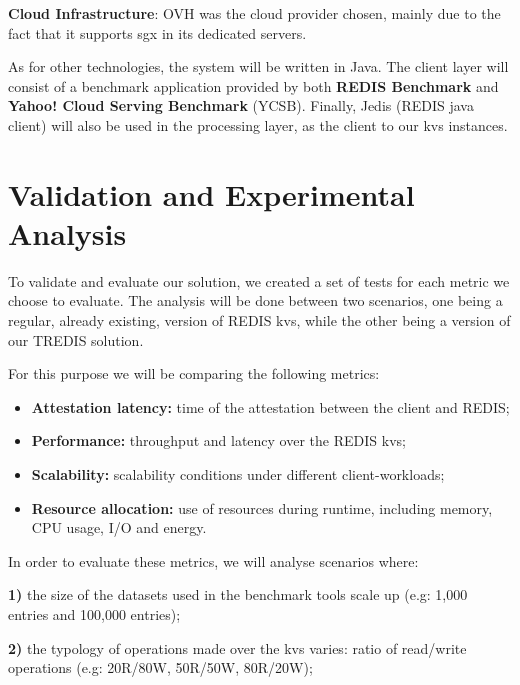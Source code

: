 \textbf{Cloud Infrastructure}: OVH \cite{ovhCloud} was the cloud provider chosen, mainly due to the fact that it supports \gls{sgx} in its dedicated servers.

As for other technologies, the system will be written in Java. The client layer will consist of a benchmark application provided by both \textbf{REDIS Benchmark} and \textbf{Yahoo! Cloud Serving Benchmark} (YCSB). Finally, Jedis (REDIS java client) will also be used in the processing layer, as the client to our \gls{kvs} instances.

\section{Validation and Experimental Analysis} %
\label{sec:floats_figures_and_captions}




To validate and evaluate our solution, we created a set of tests for each metric we choose to evaluate. The analysis will be done between two scenarios, one being a regular, already existing, version of REDIS \gls{kvs}, while the other being a version of our TREDIS solution.

For this purpose we will be comparing the following metrics:

\begin{itemize}
	\item \textbf{Attestation latency:} time of the attestation between the client and REDIS;
	\item \textbf{Performance:} throughput and latency over the REDIS \gls{kvs};
	\item \textbf{Scalability:} scalability conditions under different client-workloads;
	\item \textbf{Resource allocation:} use of resources during runtime, including memory, CPU usage, I/O and energy.
\end{itemize}

In order to evaluate these metrics, we will analyse scenarios where:

\textbf{1)} the size of the datasets used in the benchmark tools scale up (e.g: 1,000 entries and 100,000 entries);

\textbf{2)} the typology of operations made over the \gls{kvs} varies: ratio of read/write operations (e.g: 20R/80W, 50R/50W, 80R/20W);


